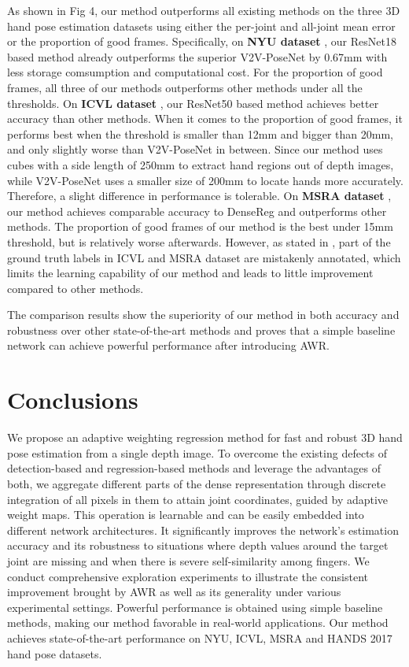 \documentclass[letterpaper]{article} \usepackage{aaai20}  \usepackage{times}  \usepackage{helvet} \usepackage{courier}  \usepackage[hyphens]{url}  \usepackage{graphicx} \usepackage{amsmath}
\begin{document}
As shown in Fig 4, our method outperforms all existing methods on the three 3D hand pose estimation datasets using either the per-joint and all-joint mean error or the proportion of good frames. Specifically, on \textbf{NYU dataset} \cite{nyu}, our ResNet18 based method already outperforms the superior V2V-PoseNet by 0.67mm with less storage comsumption and computational cost. For the proportion of good frames, all three of our methods outperforms other methods under all the thresholds. On \textbf{ICVL dataset} \cite{icvl}, our ResNet50 based method achieves better accuracy than other methods. When it comes to the proportion of good frames, it performs best when the threshold is smaller than 12mm and bigger than 20mm, and only slightly worse than V2V-PoseNet in between. Since our method uses cubes with a side length of 250mm to extract hand regions out of depth images, while V2V-PoseNet \cite{v2v} uses a smaller size of 200mm to locate hands more accurately. Therefore, a slight difference in performance is tolerable. On \textbf{MSRA dataset} \cite{offset2}, our method achieves comparable accuracy to DenseReg \cite{dense3d} and outperforms other methods. The proportion of good frames of our method is the best under 15mm threshold, but is relatively worse afterwards. However, as stated in \cite{fine}, part of the ground truth labels in ICVL \cite{icvl} and MSRA \cite{offset2} dataset are mistakenly annotated, which limits the learning capability of our method and leads to little improvement compared to other methods.

The comparison results show the superiority of our method in both accuracy and robustness over other state-of-the-art methods and proves that a simple baseline network can achieve powerful performance after introducing AWR.

\section{Conclusions}
We propose an adaptive weighting regression method for fast and robust 3D hand pose estimation from a single depth image. To overcome the existing defects of detection-based and regression-based methods and leverage the advantages of both, we aggregate different parts of the dense representation through discrete integration of all pixels in them to attain joint coordinates, guided by adaptive weight maps. This operation is learnable and can be easily embedded into different network architectures. It significantly improves the network's estimation accuracy and its robustness to situations where depth values around the target joint are missing and when there is severe self-similarity among fingers. We conduct comprehensive exploration experiments to illustrate the consistent improvement brought by AWR as well as its generality under various experimental settings. Powerful performance is obtained using simple baseline methods, making our method favorable in real-world applications. Our method achieves state-of-the-art performance on NYU, ICVL, MSRA and HANDS 2017 hand pose datasets. \cite{awr}



\end{document}
